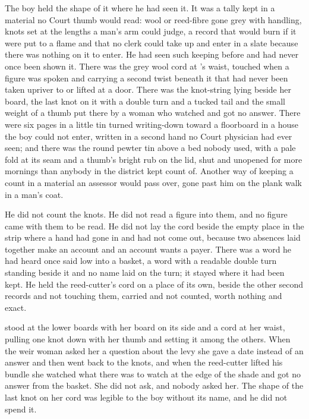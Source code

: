 The boy held the shape of it where he had seen it. It was a tally kept in a material no Court thumb would read: wool or reed-fibre gone grey with handling, knots set at the lengths a man's arm could judge, a record that would burn if it were put to a flame and that no clerk could take up and enter in a slate because there was nothing on it to enter. He had seen such keeping before and had never once been shown it. There was the grey wool cord at 's waist, touched when a figure was spoken and carrying a second twist beneath it that had never been taken upriver to  or lifted at a door. There was the knot-string lying beside her board, the last knot on it with a double turn and a tucked tail and the small weight of a thumb put there by a woman who watched and got no answer. There were six pages in a little tin turned writing-down toward a floorboard in a house the boy could not enter, written in a second hand no Court physician had ever seen; and there was the round pewter tin above a bed nobody used, with a pale fold at its seam and a thumb's bright rub on the lid, shut and unopened for more mornings than anybody in the district kept count of. Another way of keeping a count in a material an assessor would pass over, gone past him on the plank walk in a man's coat.

He did not count the knots. He did not read a figure into them, and no figure came with them to be read. He did not lay the cord beside the empty place in the strip where a hand had gone in and had not come out, because two absences laid together make an account and an account wants a payer. There was a word he had heard once said low into a basket, a word with a readable double turn standing beside it and no name laid on the turn; it stayed where it had been kept. He held the reed-cutter's cord on a place of its own, beside the other second records and not touching them, carried and not counted, worth nothing and exact.

 stood at the lower boards with her board on its side and a cord at her waist, pulling one knot down with her thumb and setting it among the others. When the weir woman asked her a question about the levy she gave a date instead of an answer and then went back to the knots, and when the reed-cutter lifted his bundle she watched what there was to watch at the edge of the shade and got no answer from the basket. She did not ask, and nobody asked her. The shape of the last knot on her cord was legible to the boy without its name, and he did not spend it.

